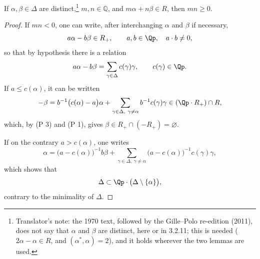 \begin{lemma}\label{sga3:XXI:3.2.10}
If \(\alpha,\beta\in\Delta\) are distinct,\footnote{Translator's note: the 1970 text,
followed by the Gille--Polo re-edition (2011), does not say that \(\alpha\) and \(\beta\)
are distinct, here or in 3.2.11; this is needed (\(2\alpha-\alpha\in R\), and
\((\alpha^\ast,\alpha)=2\)), and it holds wherever the two lemmas are used.}
\(m,n\in\mathbb Q\), and
\(m\alpha+n\beta\in R\), then \(mn\geq0\).
\end{lemma}

\begin{proof}
If \(mn<0\), one can write, after interchanging \(\alpha\) and
\(\beta\) if necessary,
\[
 a\alpha-b\beta\in R_+,
 \qquad a,b\in\Qp,\quad a\cdot b\neq0,
\]
so that by hypothesis there is a relation
\[
 a\alpha-b\beta
   =\sum_{\gamma\in\Delta}c(\gamma)\gamma,
 \qquad c(\gamma)\in\Qp.
\]
If \(a\leq c(\alpha)\), it can be written
\[
 -\beta
 =b^{-1}\bigl(c(\alpha)-a\bigr)\alpha
  +\sum_{\gamma\in\Delta,\ \gamma\neq\alpha}b^{-1}c(\gamma)\gamma
 \in(\Qp\cdot R_+)\cap R,
\]
which, by (P 3) and (P 1), gives
\(\beta\in R_+\cap(-R_+)=\varnothing\).

If on the contrary \(a>c(\alpha)\), one writes
\[
 \alpha=\bigl(a-c(\alpha)\bigr)^{-1}b\beta
  +\sum_{\gamma\in\Delta,\ \gamma\neq\alpha}\bigl(a-c(\alpha)\bigr)^{-1}c(\gamma)\gamma,
\]
which shows that
\[
 \Delta\subset\Qp\cdot\bigl(\Delta\setminus\{\alpha\}\bigr),
\]
contrary to the minimality of \(\Delta\).
\end{proof}
